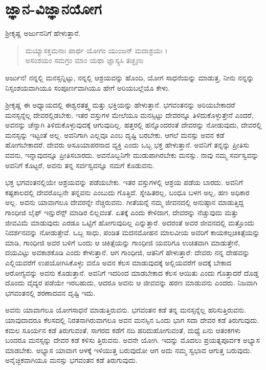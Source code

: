 
\chapter{ಜ್ಞಾನ-ವಿಜ್ಞಾನಯೋಗ}

ಶ್ರೀಕೃಷ್ಣ ಅರ್ಜುನನಿಗೆ ಹೇಳುತ್ತಾನೆ.

\begin{verse}
ಮಯ್ಯಾಸಕ್ತಮನಾಃ ಪಾರ್ಥ ಯೋಗಂ ಯುಂಜನ್ ಮದಾಶ್ರಯಃ ।\\ಅಸಂಶಯಂ ಸಮಗ್ರಂ ಮಾಂ ಯಥಾ ಜ್ಞಾಸ್ಯಸಿ ತಚ್ಛೃಣು 
\end{verse}

{\small ಅರ್ಜುನ! ನನ್ನಲ್ಲಿ ಮನಸ್ಸನ್ನಿಟ್ಟು, ನನ್ನಲ್ಲಿ ಆಶ್ರಯವನ್ನು ಹೊಂದಿ, ಯೋಗ ಸಾಧನೆಯನ್ನು ಮಾಡುತ್ತ, ನೀನು ನನ್ನನ್ನು ನಿಸ್ಸಂಶಯವಾಗಿಯೂ ಸಂಪೂರ್ಣವಾಗಿಯೂ ಹೇಗೆ ಅರಿಯಬಲ್ಲೆಯೊ ಕೇಳು.}

ಶ್ರೀಕೃಷ್ಣ ಈ ಅಧ್ಯಾಯದಲ್ಲಿ ಈಶ್ವರತತ್ತ್ವ ಮತ್ತು ಭಕ್ತಿಯನ್ನು ಹೇಳುತ್ತಾನೆ. ಭಗವಂತನನ್ನು ಅರಿಯಬೇಕಾದರೆ ಮನಸ್ಸನ್ನೆಲ್ಲ ದೇವರಲ್ಲಿಡಬೇಕು. ಇತರ ವಸ್ತುಗಳ ಮೇಲೆಯೂ ಮನಸ್ಸಿಟ್ಟು ದೇವರನ್ನೂ ತಿಳಿದುಕೊಳ್ಳುತ್ತೇನೆ ಎಂದರೆ, ಅವನನ್ನು ಚೆನ್ನಾಗಿ ತಿಳಿದುಕೊಳ್ಳುವುದಕ್ಕೆ ಆಗುವುದಿಲ್ಲ. ಹತ್ತರಲ್ಲಿ ಹನ್ನೊಂದರಂತೆ ದೇವರನ್ನು ನೋಡುವುದು, ದೇವರಲ್ಲಿ ಮನಸ್ಸನ್ನು ಇಟ್ಟಂತೆ ಅಲ್ಲ. ಅವನಿಗಾಗಿ ಎಲ್ಲವೂ ಎಂಬ ದೃಷ್ಟಿ ಬರಬೇಕು. ಆಗಲೆ ಮನಸ್ಸು ಅವನ ಕಡೆ ಹೋಗಬೇಕಾದರೆ. ದೇವರು ಅಸೂಯಾಪರನಾದ ವ್ಯಕ್ತಿ ಎಂದು ಒಬ್ಬ ಭಕ್ತ ಹೇಳುತ್ತಾನೆ. ಅವನಿಗೆ ತನ್ನನ್ನು ಪ್ರೀತಿಸು ವವನು, ಇನ್ನಾವುದನ್ನೂ ಪ್ರೀತಿಸಬಾರದು. ಅವನೊಬ್ಬನಿಗೇ ಮುಡುಪಾಗಿರಬೇಕು ಮನಸ್ಸು. ನಾವು ನಮ್ಮ ಸರ್ವಸ್ವವನ್ನು ಅವನಿಗೆ ಕೊಟ್ಟರೆ, ಅವನು ತನ್ನ ಸರ್ವಸ್ವವನ್ನೂ ನಮಗೆ ಕೊಡುವನು.

ಭಕ್ತ ಭಗವಂತನಲ್ಲಿಯೇ ಆಶ್ರಯವನ್ನು ಪಡೆಯಬೇಕು. ಇತರ ವಸ್ತುಗಳಲ್ಲಿ ಆಶ್ರಯ ಪಡೆಯ ಬಾರದು. ಅವನಿಗೆ ಕಷ್ಟಕಾಲದಲ್ಲಿ ದೇವರೊಬ್ಬನೇ ತನ್ನವನು ಎಂಬುದು ಗೊತ್ತಿದೆ. ಸ್ನೇಹಿತರಲ್ಲ, ಬಂಧೂ ಬಳಗ ಅಲ್ಲ, ಹಣ ಅಧಿಕಾರ ಅಲ್ಲ. ಅವನು ಯಾವಾಗಲೂ ದೇವರನ್ನೇ ನೆಚ್ಚಿರುವನು. ಗೀತೆಯನ್ನೆ ನಮ್ಮ ಜೀವನದಲ್ಲಿ ಅನುಷ್ಠಾನ ಮಾಡುತ್ತಿದ್ದ ಗಾಂಧೀಜಿ ಲೈಫ್ ಇನ್ಷುರೆನ್ಸ್ ಮಾಡಿರ ಲಿಲ್ಲವಂತೆ. ಏತಕ್ಕೆ ಎಂದು ಕೇಳಿದಾಗ, ದೇವರನ್ನು ನೆಚ್ಚುವುದು ಮತ್ತು ಜೀವವಿಮೆ ಮಾಡುವುದು ಎರಡೂ ಒಟ್ಟಿಗೆ ಹೋಗುವುದಿಲ್ಲ ಎನ್ನುತ್ತಾರೆ. ಅದರಂತೆ ಅವರ ಜೀವನದಲ್ಲಿ ಮತ್ತೊಂದು ನಿದರ್ಶನವನ್ನು ನೋಡುತ್ತೇವೆ. ಒಬ್ಬ ಸಾಧು, ಪಂಡಿತ ಮದನಮೋಹನ ಮಾಲವೀಯ ಅವರಿಗೆ ಕಾಯಕಲ್ಪಚಿಕಿತ್ಸೆಯನ್ನು ಮಾಡಿ, ಗಾಂಧೀಜಿ ಅವರ ಬಳಿಗೆ ಬಂದು ಆ ಚಿಕಿತ್ಸೆಯನ್ನು ಗಾಂಧೀಜಿ ಯವರಿಗೂ ಉಚಿತವಾಗಿ ಮಾಡುತ್ತೇನೆ, ದಯವಿಟ್ಟು ಅವಕಾಶಕೊಡಿ ಎಂದು ಕೇಳುತ್ತಾನೆ. ಆಗ ಗಾಂಧೀಜಿ, ಆತನಿಗೆ ಹೇಳುತ್ತಾರೆ: ದೇವರು ನನ್ನ ದೇಹವನ್ನು ಎಲ್ಲಿಯವರೆಗೆ ಉಪಯೋಗಿಸಿಕೊಳ್ಳು ವನೊ ಅವನ ಕೆಲಸ ಮಾಡುವುದಕ್ಕೆ ಅಲ್ಲಿಯವರೆಗೆ ಅದಕ್ಕೆ ಬೇಕಾದ ಆರೋಗ್ಯವನ್ನು ಅವನು ಕೊಡುತ್ತಾನೆ. ಅವನಿಗೆ ಇದರಿಂದ ಮಾಡಬೇಕಾದ ಕೆಲಸ ಆಯಿತು ಎಂದು ಗೊತ್ತಾದರೆ ದೊಡ್ಡ ದೊಂದು ವೈದ್ಯರ ಪಡೆಯೇ ಇರಬಹುದು, ಆದರೂ ಅವನು ಆ ಜೀವವನ್ನು ಹರಣ ಮಾಡುವನು ಎಂದರು. ನಿಜವಾಗಿ ಭಗವಂತನಲ್ಲಿ ಶರಣಾದವನ ದೃಷ್ಟಿ ಇದು.

ಅವನು ಯಾವಾಗಲೂ ಯೋಗಸಾಧನೆ ಮಾಡುತ್ತಿರುವನು. ಭಗವಂತನ ಕಡೆ ತನ್ನ ಮನಸ್ಸನ್ನೆಲ್ಲ ಹರಿಸುತ್ತಿರುವನು. ಯಾವುದಾದರೂ ಕೆಲಸದಲ್ಲಿ ನಿರತನಾಗಿರುವಾಗಲೂ ಅವನ ಮನಸ್ಸಿನ ಒಂದು ಭಾಗ ಸದಾ ದೇವರ ಕಡೆ ತಿರುಗುವುದು. ಕಮಲ ಸೂರ್ಯನ ಕಡೆ ತಿರುಗುವಂತೆ, ಸಾಗರದ ಕಡೆಗೆ ನದಿ ಹರಿದುಹೋಗುವಂತೆ, ಮಧ್ಯೆ ಏನು ಆತಂಕಗಳು ಬಂದರೂ ಮನಸ್ಸನ್ನು ದೇವರ ಕಡೆ ಕಳಿಸು ತ್ತಿರುವನು. ಅವನೇ ಯೋಗಿ. ಇದನ್ನು ಮೊದಲು ಪ್ರಯತ್ನಪೂರ್ವಕ ಅಭ್ಯಾಸ ಮಾಡಬೇಕು. ಅಭ್ಯಾಸ ಯಾವಾಗ ಆಳಕ್ಕೆ ಇಳಿಯುತ್ತ ಬರುವುದೋ ಆಗ ಅದು ನಮ್ಮ ಸ್ವಭಾವ ಆಗುತ್ತ ಬರುವುದು. ಅನೈಚ್ಛಿಕವಾಗಿಯೂ ಮನಸ್ಸು ಭಗವಂತನ ಕಡೆ ತಿರುಗುವುದು.

